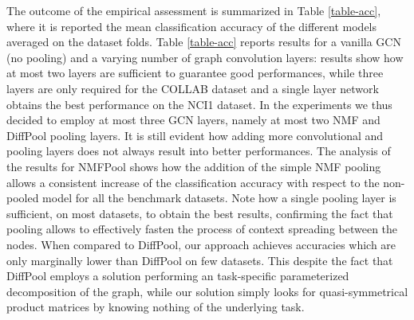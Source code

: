 \documentclass[runningheads]{llncs}
\begin{document}
The outcome of the empirical assessment is summarized in Table \ref{table-acc}, where it is reported the mean classification accuracy of the different models averaged on the dataset folds. Table \ref{table-acc} reports results for a vanilla GCN (no pooling) and a varying number of graph convolution layers: results show how at most two layers are sufficient to guarantee good performances, while three layers are only required for the COLLAB dataset and a single layer network obtains the best performance on the NCI1 dataset. In the experiments we thus decided to employ at most three GCN layers, namely at most two NMF and DiffPool pooling layers. It is still evident how adding more convolutional and pooling layers does not always result into better performances. The analysis of the results for NMFPool shows how the addition of the simple NMF pooling allows a consistent increase of the classification accuracy with respect to the non-pooled model for all the benchmark datasets. Note how a single pooling layer is sufficient, on most datasets, to obtain the best results, confirming the fact that pooling allows to effectively fasten the process of context spreading between the nodes. When compared to DiffPool, our approach achieves accuracies which are only marginally lower than DiffPool on few datasets. This despite the fact that DiffPool employs a solution performing an task-specific parameterized decomposition of the graph, while our solution simply looks for quasi-symmetrical product matrices by knowing nothing of the underlying task.
\end{document}
